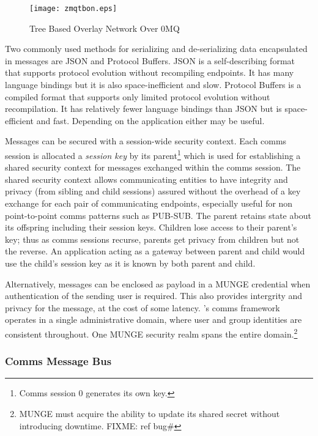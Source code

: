 \begin{figure}
\centering
\texttt{[image: zmqtbon.eps]}
\caption{Tree Based Overlay Network Over 0MQ}
\label{FigZmqTBON}
\end{figure}

Two commonly used methods for serializing and de-serializing data
encapsulated in messages are
JSON\cite{rfc4627} 
and Protocol Buffers\cite{Protobuf}.
JSON is a self-describing format
that supports protocol evolution without recompiling endpoints.  It has
many language bindings but it is also space-inefficient and slow.
Protocol Buffers is a compiled format that supports
only limited protocol evolution without recompilation.  It has relatively
fewer language bindings than JSON but is space-efficient and fast.
Depending on the application either may be useful.

Messages can be secured with a session-wide security context.
Each comms session is allocated a {\em session key} by its parent\footnote{
Comms session 0 generates its own key.}
which is used for establishing a shared security context
for messages exchanged within the comms session.
The shared security context allows communicating entities to have integrity
and privacy (from sibling and child sessions) assured without the overhead
of a key exchange for each pair of communicating endpoints,
especially useful for non point-to-point comms patterns such as PUB-SUB.
The parent retains state about its offspring including their session keys.
Children lose access to their parent's key;  thus as comms sessions recurse,
parents get privacy from children but not the reverse.
An application acting as a gateway between parent and child would use
the child's session key as it is known by both parent and child.

Alternatively, messages can be enclosed as payload in a MUNGE\cite{MUNGE}
credential when authentication of the sending user is required.
This also provides intergrity and privacy for the message, at the cost
of some latency.
\ngrm's comms framework operates in
a single administrative domain, where user and group identities are
consistent throughout.  One MUNGE security realm spans the entire
domain.\footnote{MUNGE must acquire the ability to update its shared
secret without introducing downtime. FIXME: ref bug\#}

\subsubsection{Comms Message Bus}

